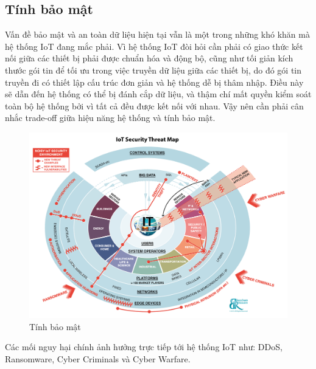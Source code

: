 \subsection*{Tính bảo mật} Vấn đề bảo mật và an toàn dữ liệu hiện tại vẫn là một trong những khó khăn mà hệ thống IoT đang mắc phải. Vì hệ thống IoT đòi hỏi cần phải có giao thức kết nối giữa các thiết bị phải được chuẩn hóa và động bộ, cũng như tối giản kích thước gói tin để tối ưu trong việc truyền dữ liệu giữa các thiết bị, do đó gói tin truyền đi có thiết lập cấu trúc đơn giản và hệ thống dễ bị thâm nhập. Điều này sẽ dẫn đến hệ thống có thể bị đánh cắp dữ liệu, và thậm chí mất quyền kiểm soát toàn bộ hệ thống bởi vì tất cả đều được kết nối với nhau. Vậy nên cần phải cân nhắc trade-off giữa hiệu năng hệ thống và tính bảo mật.
\begin{figure}[H]
\centering    
\includegraphics[width=5in]{virusiot}
\caption[Tính bảo mật]{Tính bảo mật}
\label{fig:virusiot}
\end{figure}

Các mối nguy hại chính ảnh hưởng trực tiếp tới hệ thống IoT như: DDoS, Ransomware, Cyber Criminals và Cyber Warfare. 
